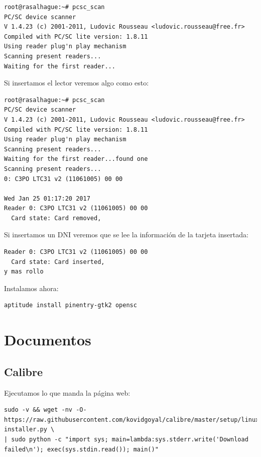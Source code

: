 \documentclass[12pt,spanish,]{scrartcl}
\begin{document}
\begin{verbatim}
root@rasalhague:~# pcsc_scan 
PC/SC device scanner
V 1.4.23 (c) 2001-2011, Ludovic Rousseau <ludovic.rousseau@free.fr>
Compiled with PC/SC lite version: 1.8.11
Using reader plug'n play mechanism
Scanning present readers...
Waiting for the first reader...
\end{verbatim}

Si insertamos el lector veremos algo como esto:

\begin{verbatim}
root@rasalhague:~# pcsc_scan 
PC/SC device scanner
V 1.4.23 (c) 2001-2011, Ludovic Rousseau <ludovic.rousseau@free.fr>
Compiled with PC/SC lite version: 1.8.11
Using reader plug'n play mechanism
Scanning present readers...
Waiting for the first reader...found one
Scanning present readers...
0: C3PO LTC31 v2 (11061005) 00 00

Wed Jan 25 01:17:20 2017
Reader 0: C3PO LTC31 v2 (11061005) 00 00
  Card state: Card removed, 
\end{verbatim}

Si insertamos un DNI veremos que se lee la información de la tarjeta
insertada:

\begin{verbatim}
Reader 0: C3PO LTC31 v2 (11061005) 00 00
  Card state: Card inserted, 
y mas rollo
\end{verbatim}

Instalamos ahora:

\begin{verbatim}
aptitude install pinentry-gtk2 opensc
\end{verbatim}

\section{Documentos}\label{documentos}

\subsection{Calibre}\label{calibre}

Ejecutamos lo que manda la página web:

\begin{verbatim}
sudo -v && wget -nv -O- https://raw.githubusercontent.com/kovidgoyal/calibre/master/setup/linux-installer.py \
| sudo python -c "import sys; main=lambda:sys.stderr.write('Download failed\n'); exec(sys.stdin.read()); main()"
\end{verbatim}
\end{document}
